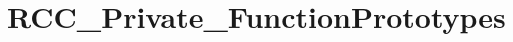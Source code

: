 \hypertarget{group___r_c_c___private___function_prototypes}{}\section{R\+C\+C\+\_\+\+Private\+\_\+\+Function\+Prototypes}
\label{group___r_c_c___private___function_prototypes}
